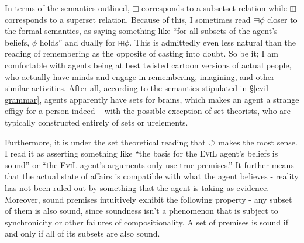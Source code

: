 In terms of the semantics outlined, $\boxminus$ corresponds to a subsetset
relation while $\boxplus$ corresponds to a superset relation.  Because of
this, I sometimes read $\boxminus \phi$ closer to the formal semantics, as
saying something like ``for all subsets of the agent's beliefs, $\phi$ holds''
and dually for $\boxplus \phi$.  This is admittedly even less natural than
the reading of remembering as the opposite of casting into doubt.  So be it;
I am comfortable with  agents being at best twisted cartoon
versions of actual people, who actually have minds and engage in remembering,
imagining, and other similar activities.  After all, according to the
semantics stipulated in \S\ref{evil-grammar},  agents apparently have sets
for brains, which makes an  agent a strange effigy for a person
indeed -- with the possible exception of set theorists, who are
typically constructed entirely of sets or urelements.

Furthermore, it is under the set theoretical reading that $\circlearrowleft$ makes
the most sense.  I read it as asserting something like ``the basis for
the \textsc{EviL} agent's beliefs is sound'' or ``the \textsc{EviL}
agent's arguments only use true premises.''  It further means that the
actual state of affairs is compatible with what the agent believes -
reality has not been ruled out by something that the agent is taking
as evidence.  Moreover, sound premises intuitively exhibit the
following property - any subset of them is also sound, since soundness
isn't a phenomenon that is subject to synchronicity or other failures
of compositionality.  A set of premises is sound if and only if all of
its subsets are also sound.

